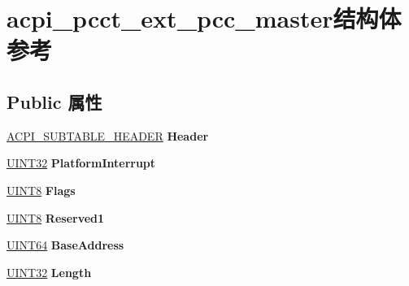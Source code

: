 \hypertarget{structacpi__pcct__ext__pcc__master}{}\section{acpi\+\_\+pcct\+\_\+ext\+\_\+pcc\+\_\+master结构体 参考}
\label{structacpi__pcct__ext__pcc__master}
\subsection*{Public 属性}
\begin{DoxyCompactItemize}
\item 
\mbox{\label{structacpi__pcct__ext__pcc__master_a5df66ce1f6db5f541e74d96472b96580}} 
\hyperlink{structacpi__subtable__header}{A\+C\+P\+I\+\_\+\+S\+U\+B\+T\+A\+B\+L\+E\+\_\+\+H\+E\+A\+D\+ER} {\bfseries Header}
\item 
\mbox{\label{structacpi__pcct__ext__pcc__master_acd2da4f69fecf7d2cff4989a3ff08121}} 
\hyperlink{_processor_bind_8h_ae1e6edbbc26d6fbc71a90190d0266018}{U\+I\+N\+T32} {\bfseries Platform\+Interrupt}
\item 
\mbox{\label{structacpi__pcct__ext__pcc__master_ac219650ff1a42ae13883a6bf85299c34}} 
\hyperlink{_processor_bind_8h_ab27e9918b538ce9d8ca692479b375b6a}{U\+I\+N\+T8} {\bfseries Flags}
\item 
\mbox{\label{structacpi__pcct__ext__pcc__master_a37325bb4dbfd99ca83cb8f305bd052ad}} 
\hyperlink{_processor_bind_8h_ab27e9918b538ce9d8ca692479b375b6a}{U\+I\+N\+T8} {\bfseries Reserved1}
\item 
\mbox{\label{structacpi__pcct__ext__pcc__master_a7dfd88aa4f7c3aed32536dd01a2193e5}} 
\hyperlink{_processor_bind_8h_a57be03562867144161c1bfee95ca8f7c}{U\+I\+N\+T64} {\bfseries Base\+Address}
\item 
\mbox{\label{structacpi__pcct__ext__pcc__master_a6c9f4320f2613416d0a5a9757287f502}} 
\hyperlink{_processor_bind_8h_ae1e6edbbc26d6fbc71a90190d0266018}{U\+I\+N\+T32} {\bfseries Length}
\item 

\end{DoxyCompactItemize}
